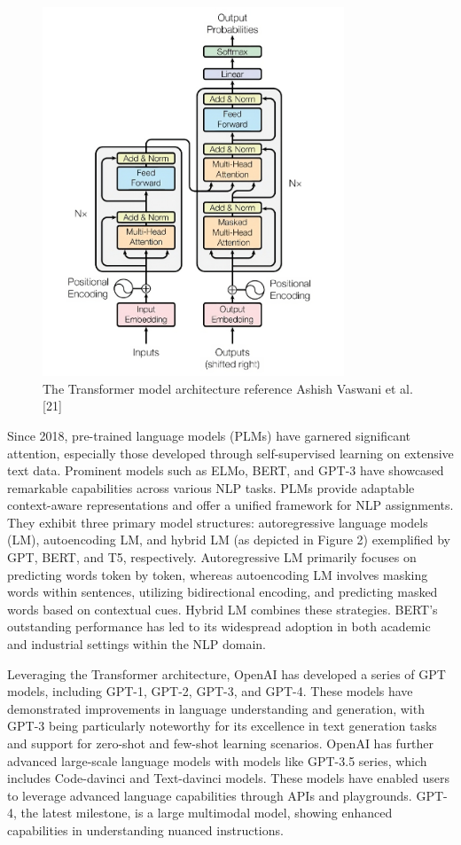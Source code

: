 \documentclass[conference]{IEEEtran}
\begin{document}
\begin{figure}[htp]
    \includegraphics[width=9cm]{transformer}
    \caption{The Transformer model architecture reference Ashish Vaswani et al. [21]}
    \label{fig:galaxy}
\end{figure}

Since 2018, pre-trained language models (PLMs) have garnered significant attention, especially those developed through self-supervised learning on extensive text data. Prominent models such as ELMo, BERT, and GPT-3 have showcased remarkable capabilities across various NLP tasks. PLMs provide adaptable context-aware representations and offer a unified framework for NLP assignments. They exhibit three primary model structures: autoregressive language models (LM), autoencoding LM, and hybrid LM (as depicted in Figure 2) exemplified by GPT, BERT, and T5, respectively. Autoregressive LM primarily focuses on predicting words token by token, whereas autoencoding LM involves masking words within sentences, utilizing bidirectional encoding, and predicting masked words based on contextual cues. Hybrid LM combines these strategies. BERT's outstanding performance has led to its widespread adoption in both academic and industrial settings within the NLP domain.

Leveraging the Transformer architecture, OpenAI has developed a series of GPT models, including GPT-1, GPT-2, GPT-3, and GPT-4. These models have demonstrated improvements in language understanding and generation, with GPT-3 being particularly noteworthy for its excellence in text generation tasks and support for zero-shot and few-shot learning scenarios. OpenAI has further advanced large-scale language models with models like GPT-3.5 series, which includes Code-davinci and Text-davinci models. These models have enabled users to leverage advanced language capabilities through APIs and playgrounds. GPT-4, the latest milestone, is a large multimodal model, showing enhanced capabilities in understanding nuanced instructions.
\end{document}
